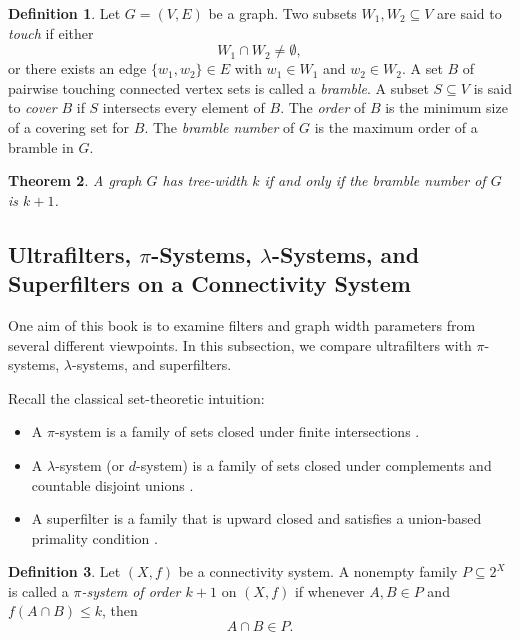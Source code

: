 \documentclass[10pt]{book}
\newtheorem{theorem}{Theorem}[section]
\theoremstyle{definition}
\newtheorem{definition}[theorem]{Definition}
\begin{document}
\begin{definition}\cite{216,Hans2008}
Let \(G=(V,E)\) be a graph. Two subsets \(W_1,W_2\subseteq V\) are said to \emph{touch} if either
\[
W_1\cap W_2\neq \emptyset,
\]
or there exists an edge \(\{w_1,w_2\}\in E\) with \(w_1\in W_1\) and \(w_2\in W_2\).  
A set \(B\) of pairwise touching connected vertex sets is called a \emph{bramble}.  
A subset \(S\subseteq V\) is said to \emph{cover} \(B\) if \(S\) intersects every element of \(B\).  
The \emph{order} of \(B\) is the minimum size of a covering set for \(B\).  
The \emph{bramble number} of \(G\) is the maximum order of a bramble in \(G\).
\end{definition}

\begin{theorem}\cite{216}
A graph \(G\) has tree-width \(k\) if and only if the bramble number of \(G\) is \(k+1\).
\end{theorem}

\subsection{Ultrafilters, \(\pi\)-Systems, \(\lambda\)-Systems, and Superfilters on a Connectivity System}

One aim of this book is to examine filters and graph width parameters from several different viewpoints.  
In this subsection, we compare ultrafilters with \(\pi\)-systems, \(\lambda\)-systems, and superfilters.

Recall the classical set-theoretic intuition:
\begin{itemize}
    \item A \(\pi\)-system is a family of sets closed under finite intersections \cite{chentsov2014some,kallenberg1997foundations,durrett2019probability}.
    \item A \(\lambda\)-system (or \(d\)-system) is a family of sets closed under complements and countable disjoint unions \cite{guide2006infinite,vestrup2009theory,kallenberg1997foundations}.
    \item A superfilter is a family that is upward closed and satisfies a union-based primality condition \cite{samet2009superfilters,tsaban2014algebra,tsaban2014algebra2}.
\end{itemize}

\begin{definition}
Let \((X,f)\) be a connectivity system.  
A nonempty family \(P\subseteq 2^X\) is called a \emph{\(\pi\)-system of order \(k+1\)} on \((X,f)\) if whenever \(A,B\in P\) and \(f(A\cap B)\leq k\), then
\[
A\cap B \in P.
\]
\end{definition}
\end{document}
